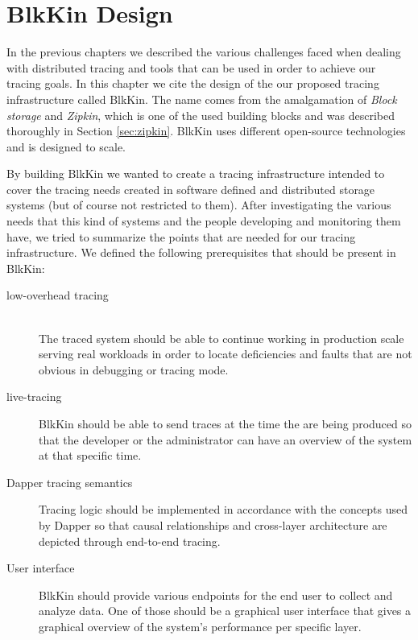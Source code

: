 \chapter{BlkKin Design}\label{ch:design}

In the previous chapters we described the various challenges faced when dealing
with distributed tracing and tools that can be used in order to achieve our
tracing goals. In this chapter we cite the design of the our proposed tracing
infrastructure called BlkKin. The name comes from the amalgamation of
\textit{Block storage} and \textit{Zipkin}, which is one of the used building
blocks and was described thoroughly in Section \ref{sec:zipkin}. BlkKin uses
different open-source technologies and is designed to scale. 

By building BlkKin we wanted to create a tracing infrastructure intended to
cover the tracing needs created in software defined and distributed storage
systems (but of course not restricted to them). After investigating the various
needs that this kind of systems and the people developing and monitoring them
have, we tried to summarize the points that are needed for our tracing
infrastructure. We defined the following prerequisites that should be present in
BlkKin:

\begin{description}

\item[low-overhead tracing] \hfill \\
The traced system should be able to continue working in production scale serving
real workloads in order to locate deficiencies and faults that are not obvious
in debugging or tracing mode.

\item[live-tracing]
BlkKin should be able to send traces at the time the are being produced so that
the developer or the administrator can have an overview of the system at that
specific time.

\item[Dapper tracing semantics]
Tracing logic should be implemented in accordance with the concepts used by
Dapper so that causal relationships and cross-layer architecture are depicted
through end-to-end tracing.

\item[User interface]
BlkKin should provide various endpoints for the end user to collect and analyze
data. One of those should be a graphical user interface that gives a graphical
overview of the system's performance per specific layer.

\end{description}

